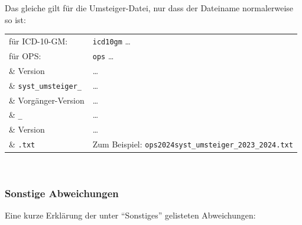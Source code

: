 \newpage %

Das gleiche gilt für die Umsteiger-Datei, nur dass der Dateiname normalerweise so ist:

\begingroup
\renewcommand{\arraystretch}{1.0}
\begin{tabular}{p{4cm}l}
für ICD-10-GM: & \texttt{icd10gm} \ldots\\
für OPS: & \texttt{ops} \ldots\\
\& Version & \ldots\\
\& \texttt{syst\_umsteiger\_} & \ldots\\
\& Vorgänger-Version & \ldots\\
\& \texttt{\_} & \ldots\\
\& Version & \ldots\\
\& \texttt{.txt} & Zum Beispiel: \texttt{ops2024syst\_umsteiger\_2023\_2024.txt}\\
\end{tabular}
\endgroup \\

\subsubsection{Sonstige Abweichungen}
\label{abweichungen}

Eine kurze Erklärung der unter ``Sonstiges'' gelisteten Abweichungen:

